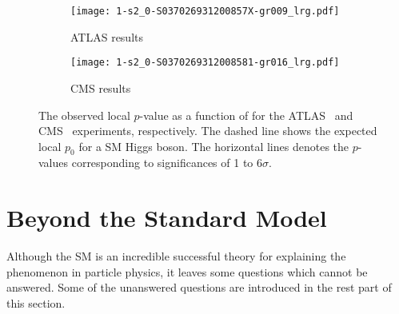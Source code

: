\begin{figure}[htbp]
    \begin{center}
        \begin{subfigure}[b]{0.48\textwidth}
            \begin{center}
                \texttt{[image: 1-s2\_0-S037026931200857X-gr009\_lrg.pdf]}
                \caption{ATLAS results}
            \end{center}
        \end{subfigure}%
        \begin{subfigure}[b]{0.48\textwidth}
            \begin{center}
                \texttt{[image: 1-s2\_0-S0370269312008581-gr016\_lrg.pdf]}
                \caption{CMS results}
            \end{center}
        \end{subfigure}
    \end{center}
    \caption{The observed local $p$-value as a function of \mH for the ATLAS~\cite{Aad:2012tfa} and CMS~\cite{Chatrchyan:2012xdj} experiments, respectively.
    The dashed line shows the expected local $p_{0}$ for a SM Higgs boson.
    The horizontal lines denotes the $p$-values corresponding to significances of 1 to 6$\sigma$.}
    \label{fig:sm_discovery_of_Higgs}
\end{figure}


\section{Beyond the Standard Model}
\label{sec:sm_bsm}
Although the SM is an incredible successful theory for explaining the phenomenon in particle physics, it leaves some questions which cannot be answered.
Some of the unanswered questions are introduced in the rest part of this section.


